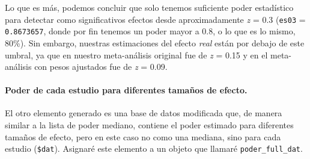 \documentclass[
  bookmarksnumbered]{article}
\newenvironment{Shaded}{\begin{snugshade}}{\end{snugshade}}
\newcommand{\NormalTok}[1]{\textcolor[rgb]{0.12,0.11,0.11}{#1}}
\newcommand{\OtherTok}[1]{\textcolor[rgb]{0.00,0.43,0.16}{#1}}
\newcommand{\SpecialCharTok}[1]{\textcolor[rgb]{0.24,0.68,0.91}{#1}}
\begin{document}
Lo que es más, podemos concluir que solo tenemos suficiente poder estadístico para detectar como significativos efectos desde aproximadamente \emph{z} = 0.3 (\texttt{es03} = \texttt{0.8673657}, donde por fin tenemos un poder mayor a 0.8, o lo que es lo mismo, 80\%). Sin embargo, nuestras estimaciones del efecto \emph{real} están por debajo de este umbral, ya que en nuestro meta-análisis original fue de \emph{z} = 0.15 y en el meta-análisis con pesos ajustados fue de \emph{z} = 0.09.

\hypertarget{poder-de-cada-estudio-para-diferentes-tamauxf1os-de-efecto.}{%
\paragraph{Poder de cada estudio para diferentes tamaños de efecto.}\label{poder-de-cada-estudio-para-diferentes-tamauxf1os-de-efecto.}}

El otro elemento generado es una base de datos modificada que, de manera similar a la lista de poder mediano, contiene el poder estimado para diferentes tamaños de efecto, pero en este caso no como una mediana, sino para cada estudio (\texttt{\$dat}). Asignaré este elemento a un objeto que llamaré \texttt{poder\_full\_dat}.

\begin{Shaded}
\end{Shaded}
\end{document}
